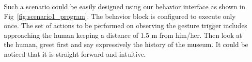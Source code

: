 \documentclass{llncs}
\begin{document}
%  
%                                         
 Such a scenario could be easily designed using our behavior interface as shown in Fig~\ref{fig:scenario1_program}. The behavior block is configured to execute only once. The set of actions to be performed on observing the gesture trigger includes approaching the human keeping a distance of 1.5 m from him/her. Then look at the human, greet first and say expressively the  history of the museum. It could be noticed that it is straight forward and intuitive.%
\end{document}

